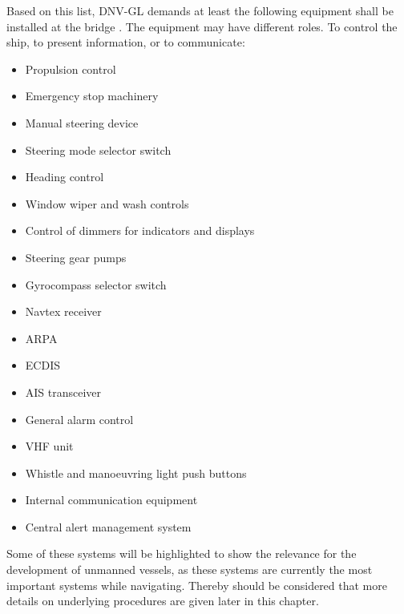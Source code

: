 Based on this list, DNV-GL demands at least the following equipment shall be installed at the bridge \cite{DNVGL2011}. The equipment may have different roles. To control the ship, to present information, or to communicate:
\begin{multicols}{2}
	\begin{itemize}
		\item Propulsion control
		\item Emergency stop machinery
		\item Manual steering device
		\item Steering mode selector switch
		\item Heading control
		\item Window wiper and wash controls
		\item Control of dimmers for indicators and displays
		\item Steering gear pumps
		\item Gyrocompass selector switch
		\item Navtex receiver
		\item \acf{ARPA}
		\item \acf{ECDIS}
		\item \acf{AIS} transceiver
		\item General alarm control
		\item \acf{VHF} unit
		\item Whistle and manoeuvring light push buttons
		\item Internal communication equipment
		\item Central alert management system
	\end{itemize}
\end{multicols}

Some of these systems will be highlighted to show the relevance for the development of unmanned vessels, as these systems are currently the most important systems while navigating. Thereby should be considered that more details on underlying procedures are given later in this chapter. 


